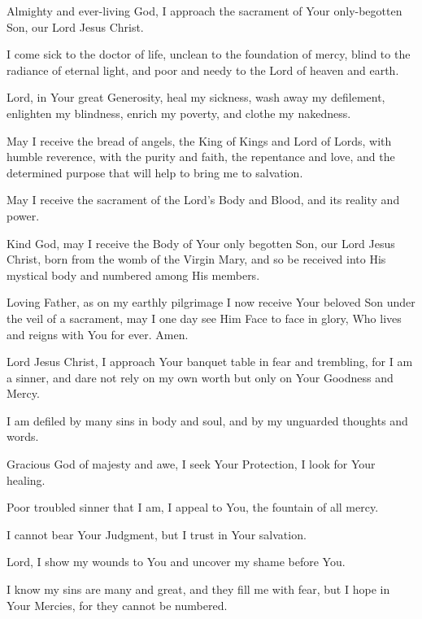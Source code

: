 Almighty and ever-living God, I approach the sacrament of Your only-begotten Son, our Lord Jesus Christ.

I come sick to the doctor of life, unclean to the foundation of mercy, blind to the radiance of eternal light, and poor and needy to the Lord of heaven and earth.

Lord, in Your great Generosity, heal my sickness, wash away my defilement, enlighten my blindness, enrich my poverty, and clothe my nakedness.

May I receive the bread of angels, the King of Kings and Lord of Lords, with humble reverence, with the purity and faith, the repentance and love, and the determined purpose that will help to bring me to salvation.

May I receive the sacrament of the Lord's Body and Blood, and its reality and power.

Kind God, may I receive the Body of Your only begotten Son, our Lord Jesus Christ, born from the womb of the Virgin Mary, and so be received into His mystical body and numbered among His members.

Loving Father, as on my earthly pilgrimage I now receive Your beloved Son under the veil of a sacrament, may I one day see Him Face to face in glory, Who lives and reigns with You for ever.
Amen.

Lord Jesus Christ, I approach Your banquet table in fear and trembling, for I am a sinner, and dare not rely on my own worth but only on Your Goodness and Mercy.

I am defiled by many sins in body and soul, and by my unguarded thoughts and words.

Gracious God of majesty and awe, I seek Your Protection, I look for Your healing.

Poor troubled sinner that I am, I appeal to You, the fountain of all mercy.

I cannot bear Your Judgment, but I trust in Your salvation.

Lord, I show my wounds to You and uncover my shame before You.

I know my sins are many and great, and they fill me with fear, but I hope in Your Mercies, for they cannot be numbered.


